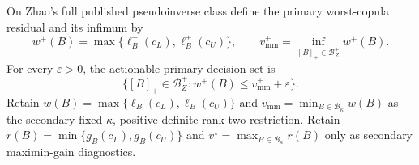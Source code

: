 On Zhao's full published pseudoinverse class define the primary worst-copula residual and its infimum by
\[
w^+(B)=\max\{\ell_B^+(c_L),\ell_B^+(c_U)\},
\qquad
v_{\mathrm{mm}}^+=\inf_{[B]_+\in\mathcal B_Z^+}w^+(B).
\]
For every \(\varepsilon>0\), the actionable primary decision set is
\[
\{[B]_+\in\mathcal B_Z^+:w^+(B)\le v_{\mathrm{mm}}^++\varepsilon\}.
\]
Retain \(w(B)=\max\{\ell_B(c_L),\ell_B(c_U)\}\) and \(v_{\mathrm{mm}}=\min_{B\in\mathcal B_\kappa}w(B)\) as the secondary fixed-\(\kappa\), positive-definite rank-two restriction.  Retain \(r(B)=\min\{g_B(c_L),g_B(c_U)\}\) and \(v^\star=\max_{B\in\mathcal B_\kappa}r(B)\) only as secondary maximin-gain diagnostics.